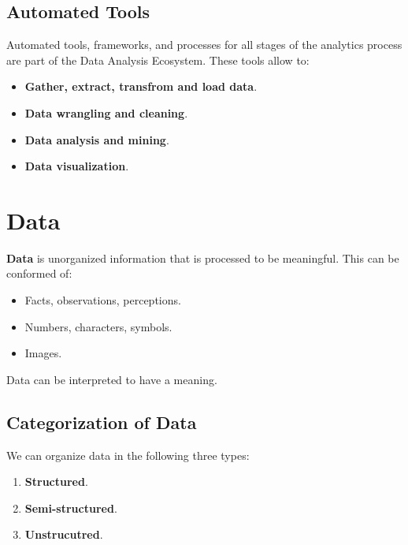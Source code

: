 \documentclass[../../ibm_data_analysis.tex]{subfiles}
\begin{document}
    \subsection{Automated Tools}

    Automated tools, frameworks, and processes for all stages of the analytics process are part of the Data Analysis Ecosystem. These tools allow to:
    \begin{itemize}
        \item \textbf{Gather, extract, transfrom and load data}.
        \item \textbf{Data wrangling and cleaning}.
        \item \textbf{Data analysis and mining}.
        \item \textbf{Data visualization}.
    \end{itemize}

    \section{Data}

    \begin{mydef}
        \textbf{Data} is unorganized information that is processed to be meaningful. This can be conformed of:
        \begin{itemize}
            \item Facts, observations, perceptions.
            \item Numbers, characters, symbols.
            \item Images.
        \end{itemize}
    \end{mydef}

    Data can be interpreted to have a meaning.

    \subsection{Categorization of Data}

    We can organize data in the following three types:

    \begin{enumerate}
        \item \textbf{Structured}.
        \item \textbf{Semi-structured}.
        \item \textbf{Unstrucutred}.
    \end{enumerate} 
\end{document}
